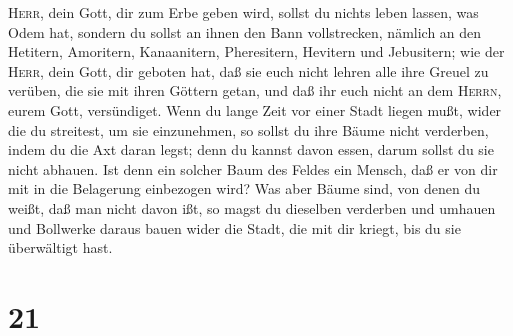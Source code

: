 \textsc{Herr}, dein Gott, dir zum Erbe geben wird, sollst du nichts
leben lassen, was Odem hat,  sondern du sollst an ihnen
den Bann vollstrecken, nämlich an den Hetitern, Amoritern, Kanaanitern,
Pheresitern, Hevitern und Jebusitern; wie der \textsc{Herr}, dein Gott,
dir geboten hat,  daß sie euch nicht lehren alle ihre
Greuel zu verüben, die sie mit ihren Göttern getan, und daß ihr euch
nicht an dem \textsc{Herrn}, eurem Gott, versündiget. 
Wenn du lange Zeit vor einer Stadt liegen mußt, wider die du streitest,
um sie einzunehmen, so sollst du ihre Bäume nicht verderben, indem du
die Axt daran legst; denn du kannst davon essen, darum sollst du sie
nicht abhauen. Ist denn ein solcher Baum des Feldes ein Mensch, daß er
von dir mit in die Belagerung einbezogen wird?  Was aber
Bäume sind, von denen du weißt, daß man nicht davon ißt, so magst du
dieselben verderben und umhauen und Bollwerke daraus bauen wider die
Stadt, die mit dir kriegt, bis du sie überwältigt hast.

\hypertarget{section-20}{%
\section{21}\label{section-20}}

